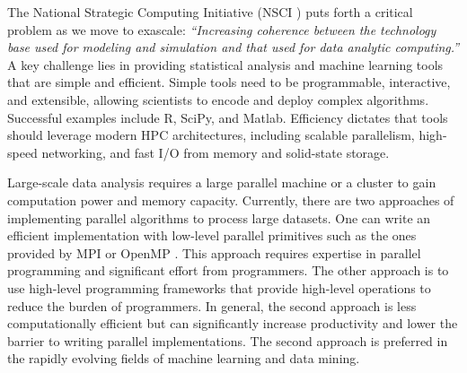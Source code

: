
The National Strategic Computing Initiative (NSCI \cite{NSCI}) puts forth a critical
problem as we move to exascale: {\em ``Increasing coherence between the technology base used for 
modeling and simulation and that used for data analytic computing.''}  
A key challenge lies in providing statistical analysis and machine learning 
tools that are simple and efficient.
Simple tools need to be programmable, interactive, and extensible, 
allowing scientists to encode and deploy complex algorithms. 
Successful examples include R, SciPy, and Matlab.  Efficiency dictates that tools should 
leverage modern HPC architectures, including scalable parallelism, high-speed networking,
and fast I/O from memory and solid-state storage.




Large-scale data analysis requires a large parallel machine or a cluster to
gain computation power and memory capacity. Currently,
there are two approaches of implementing parallel algorithms to process large
datasets. One can write an efficient implementation with low-level parallel
primitives such as the ones provided by MPI \cite{mpi} or OpenMP \cite{openmp}.
This approach requires expertise in parallel programming and significant
effort from programmers. The other approach is to use high-level programming
frameworks that provide high-level operations to reduce the burden of
programmers. In general, the second approach is less computationally
efficient but can significantly increase productivity and lower the barrier
to writing parallel implementations. The second approach is 
preferred in the rapidly evolving fields of machine learning and data mining.

